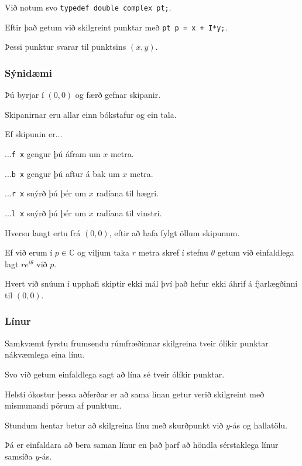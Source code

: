 {
	{
		\item<1-> Við notum svo \texttt{typedef double complex pt;}.
		\item<2-> Eftir það getum við skilgreint punktar með \texttt{pt p = x + I*y;}.
		\item<3-> Þessi punktur svarar til punktsins $(x, y)$.
	}
}

{
	\frametitle{Sýnidæmi}
	{
		\item<1-> Þú byrjar í $(0, 0)$ og færð gefnar skipanir.
		\item<2-> Skipanirnar eru allar einn bókstafur og ein tala.
		\item<3-> Ef skipunin er...
		{
			\item<4-> ...\texttt{f x} gengur þú áfram um $x$ metra.
			\item<5-> ...\texttt{b x} gengur þú aftur á bak um $x$ metra.
			\item<6-> ...\texttt{r x} snýrð þú þér um $x$ radíana til hægri.
			\item<7-> ...\texttt{l x} snýrð þú þér um $x$ radíana til vinstri.
		}
		\item<8-> Hversu langt ertu frá $(0, 0)$, eftir að hafa fylgt öllum skipunum.
	}
}

{
	{
		\item<1-> Ef við erum í $p \in \mathbb{C}$ og viljum taka $r$ metra skref í stefnu $\theta$ getum við einfaldlega lagt $re^{i\theta}$ við $p$.
		\item<2-> Hvert við snúum í upphafi skiptir ekki mál því það hefur ekki áhrif á fjarlægðinni til $(0, 0)$.
	}
}

{
}

{
	\frametitle{Línur}
	{
		\item<1-> Samkvæmt fyrstu frumsendu rúmfræðinnar skilgreina tveir ólíkir punktar nákvæmlega eina línu.
		\item<2-> Svo við getum einfaldlega sagt að lína sé tveir ólíkir punktar.
		\item<3-> Helsti ókostur þessa aðferðar er að sama línan getur verið skilgreint með mismunandi pörum af punktum.
		\item<4-> Stundum hentar betur að skilgreina línu með skurðpunkt við $y$-ás og hallatölu. 
		\item<5-> Þá er einfaldara að bera saman línur en það þarf að höndla sérstaklega línur samsíða $y$-ás.
	}
}

